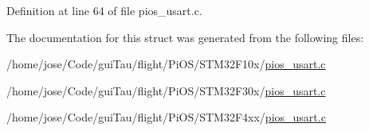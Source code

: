 Definition at line 64 of file pios\-\_\-usart.\-c.



The documentation for this struct was generated from the following files\-:\begin{DoxyCompactItemize}
\item 
/home/jose/\-Code/gui\-Tau/flight/\-Pi\-O\-S/\-S\-T\-M32\-F10x/\hyperlink{_s_t_m32_f10x_2pios__usart_8c}{pios\-\_\-usart.\-c}\item 
/home/jose/\-Code/gui\-Tau/flight/\-Pi\-O\-S/\-S\-T\-M32\-F30x/\hyperlink{_s_t_m32_f30x_2pios__usart_8c}{pios\-\_\-usart.\-c}\item 
/home/jose/\-Code/gui\-Tau/flight/\-Pi\-O\-S/\-S\-T\-M32\-F4xx/\hyperlink{_s_t_m32_f4xx_2pios__usart_8c}{pios\-\_\-usart.\-c}\end{DoxyCompactItemize}

